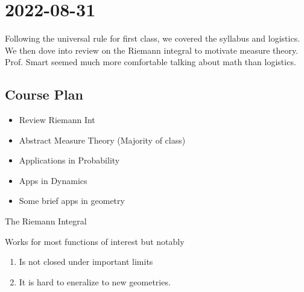 \section{2022-08-31}

Following the universal rule for first class, we covered the syllabus and logistics. We then dove into review on the Riemann integral to motivate measure theory. Prof. Smart seemed much more comfortable talking about math than logistics.

\subsection{Course Plan}
\begin{itemize}
	\item Review Riemann Int
	\item Abstract Measure Theory (Majority of class)
	\item Applications in Probability
	\item Apps in Dynamics
	\item Some brief apps in geometry
\end{itemize}
\begin{problem} The Riemann Integral 
\item Works for most functions of interest but notably
	 \begin{enumerate}
		\item Is not closed under important limits
		\item It is hard to eneralize to new geometries.
	 \end{enumerate}
	 
\end{problem}


